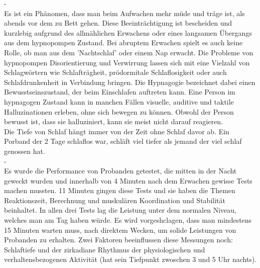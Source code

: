 -\cite{dinges1990you}\\
Es ist ein Phänomen, dass man beim Aufwachen mehr müde und träge ist, als abends vor dem zu Bett gehen. Diese Beeinträchtigung ist bescheiden und kurzlebig aufgrund des allmählichen Erwachens oder eines langsamen Übergangs aus dem hypnopompen Zustand. Bei abruptem Erwachen spielt es auch keine Rolle, ob man aus dem 'Nachtschlaf' oder einem Nap erwacht. Die Probleme von hypnopompen Disorientierung und Verwirrung lassen sich mit eine Vielzahl von Schlagwörtern wie Schlafträgheit, prödormitale Schlaflosigkeit oder auch Schlafdrunkenheit in Verbindung bringen. Die Hypnagogie bezeichnet dabei einen Bewusstseinszustand, der beim Einschlafen auftreten kann. Eine Person im hypnagogen Zustand kann in manchen Fällen visuelle, auditive und taktile Halluzinationen erleben, ohne sich bewegen zu können. Obwohl der Person bewusst ist, dass sie halluziniert, kann sie meist nicht darauf reagieren.\\
Die Tiefe von Schlaf hängt immer von der Zeit ohne Schlaf davor ab. Ein Porband der 2 Tage schlaflos war, schläft viel tiefer als jemand der viel schlaf genossen hat.\\%

-\cite{wilkinson1971performance}\\
Es wurde die Performance von Probanden getestet, die mitten in der Nacht geweckt wurden und innerhalb von 4 Minuten nach dem Erwachen gewisse Tests machen mussten. 11 Minuten gingen diese Tests und sie haben die Themen Reaktionszeit, Berechnung und muskulären Koordination und Stabilität beinhaltet. In allen drei Tests lag die Leistung unter dem normalen Niveau, welches man am Tag haben würde. Es wird vorgeshclagen, dass man mindestens 15 Minuten warten muss, nach direktem Wecken, um solide Leistungen von Probanden zu erhalten. Zwei Faktoren beeinflussen diese Messungen noch: Schlaftiefe und der zirkadiane Rhythmus der physiologischen und verhaltensbezogenen Aktivität (hat sein Tiefpunkt zwoschen 3 und 5 Uhr nachts).
